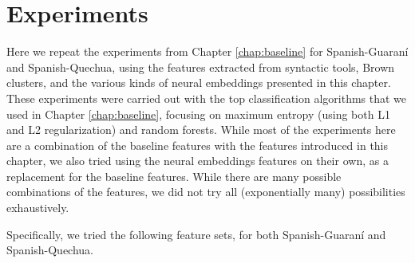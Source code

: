 \section{Experiments}
\label{sec:monolingual-experiments}
Here we repeat the experiments from Chapter \ref{chap:baseline} for
Spanish-Guaraní and Spanish-Quechua, using the features extracted from
syntactic tools, Brown clusters, and the various kinds of neural embeddings
presented in this chapter.
These experiments were carried out with the top classification algorithms that
we used in Chapter \ref{chap:baseline}, focusing on maximum entropy (using both
L1 and L2 regularization) and random forests. While most of the experiments
here are a combination of the baseline features with the features introduced in
this chapter, we also tried using the neural embeddings features on their own,
as a replacement for the baseline features. While there are many possible
combinations of the features, we did not try all (exponentially many)
possibilities exhaustively.

Specifically, we tried the following feature sets, for both Spanish-Guaraní and
Spanish-Quechua.

